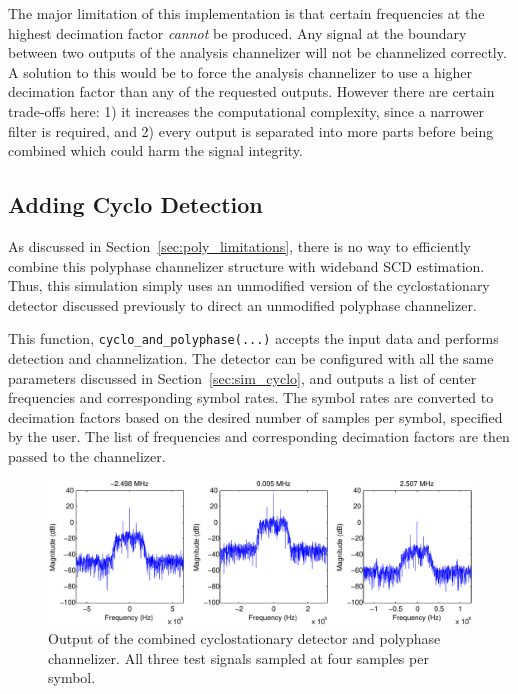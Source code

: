 \documentclass[12pt]{report}
\begin{document}
The major limitation of this implementation is that certain frequencies at the
highest decimation factor \emph{cannot} be produced. Any signal at the boundary
between two outputs of the analysis channelizer will not be channelized
correctly. A solution to this would be to force the analysis channelizer to use
a higher decimation factor than any of the requested outputs.  However there
are certain trade-offs here: 1) it increases the computational complexity,
since a narrower filter is required, and 2) every output is separated into more
parts before being combined which could harm the signal integrity.

\subsection{Adding Cyclo Detection}
\label{sec:sim_poly_cyclo}
As discussed in Section~\ref{sec:poly_limitations}, there is no way to
efficiently combine this polyphase channelizer structure with wideband SCD
estimation.  Thus, this simulation simply uses an unmodified version of the
cyclostationary detector discussed previously to direct an unmodified polyphase
channelizer.

This function, \texttt{cyclo\_and\_polyphase(...)} accepts the input
data and performs detection and channelization. The detector can be configured
with all the same parameters discussed in Section~\ref{sec:sim_cyclo}, and
outputs a list of center frequencies and corresponding symbol rates.
The symbol rates are converted to decimation factors based on the desired number
of samples per symbol, specified by the user. The list of frequencies and
corresponding decimation factors are then passed to the channelizer.

\begin{figure}[bh!]
    \includegraphics[width=\textwidth]{cyclo_poly_results}%
\caption{Output of the combined cyclostationary detector and polyphase channelizer. All three test signals sampled at four samples per symbol.}
\label{fig:cyclo_poly_results}
\end{figure}
\end{document}
